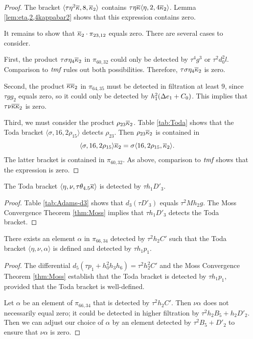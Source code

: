\begin{proof}
The bracket
$\langle \tau \eta^2 \overline{\kappa}, 8, \overline{\kappa}_2 \rangle$
contains
$\tau \eta \overline{\kappa} \langle \eta, 2, 4 \overline{\kappa}_2 \rangle$.
Lemma \ref{lem:eta,2,4kappabar2} shows that
this expression contains zero.

It remains to show that $\overline{\kappa}_2 \cdot \pi_{23, 12}$ equals zero.
There are several cases to consider.

First, the product $\tau \sigma \eta_4 \overline{\kappa}_2$ in $\pi_{60,32}$ 
could only be detected by $\tau^4 g^3$ or $\tau^2 d_0^2 l$.
Comparison to $\textit{tmf}$ rules out both possibilities.
Therefore,
$\tau \sigma \eta_4 \overline{\kappa}_2$ is zero.

Second, the product $\overline{\kappa} \overline{\kappa}_2$ in $\pi_{64,35}$ must be
detected in filtration at least $9$, since $\tau g g_2$ equals zero,
so it could only be detected by $h_1^2 (\Delta e_1 + C_0)$.
This implies that $\tau \nu \overline{\kappa} \overline{\kappa}_2$ is zero.

Third, we must consider the product $\rho_{23} \overline{\kappa}_2$.
Table \ref{tab:Toda} shows that
the Toda bracket $\langle \sigma, 16, 2 \rho_{15} \rangle$
detects $\rho_{23}$.
Then
$\rho_{23} \overline{\kappa}_2$
is contained in
\[
\langle \sigma, 16, 2 \rho_{15} \rangle \overline{\kappa}_2 =
\sigma \langle 16, 2 \rho_{15}, \overline{\kappa}_2 \rangle.
\]
The latter bracket is contained in $\pi_{60,32}$.
As above, comparison to $\textit{tmf}$ shows that the expression
is zero.
\end{proof}

\begin{lemma}
\label{lem:eta,nu,ttheta4.5kappabar}
The Toda bracket $\langle \eta, \nu, \tau \theta_{4.5} \overline{\kappa} \rangle$
is detected by $\tau h_1 D'_3$.
\end{lemma}

\begin{proof}
Table \ref{tab:Adams-d3}
shows that $d_3(\tau D'_3)$
equals
$\tau^2 M h_2 g$.
The Moss Convergence Theorem \ref{thm:Moss} implies that
$\tau h_1 D'_3$ detects the Toda bracket.
\end{proof}

\begin{lemma}
\label{lem:eta,nu,t^2h2C'}
There exists an element $\alpha$ in $\pi_{66,34}$
detected by $\tau^2 h_2 C'$ such that
the Toda bracket $\langle \eta, \nu, \alpha \rangle$
is defined and detected by $\tau h_1 p_1$.
\end{lemma}

\begin{proof}
The differential $d_5(\tau p_1 + h_0^2 h_3 h_6) = \tau^2 h_2^2 C'$
and the Moss Convergence Theorem \ref{thm:Moss} 
establish that the Toda bracket is detected by $\tau h_1 p_1$, provided
that the Toda bracket is well-defined.

Let $\alpha$ be an element of $\pi_{66,34}$ that is detected
by $\tau^2 h_2 C'$.  Then $\nu \alpha$ does not necessarily 
equal zero; it could be detected in higher filtration by
$\tau^2 h_2 B_5 + h_2 D'_2$.
Then we can adjust our choice of $\alpha$ by an element detected
by $\tau^2 B_5 + D'_2$ to ensure that $\nu \alpha$ is zero.
\end{proof}

